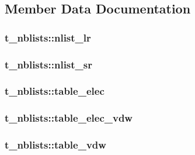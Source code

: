 \subsection{\-Member \-Data \-Documentation}
\hypertarget{structt__nblists_af90bd1d38fe8e0565e12f8f7dff77f98}{
\subsubsection[{nlist\-\_\-lr}]{ {\bf t\-\_\-nblists\-::nlist\-\_\-lr}}}\label{structt__nblists_af90bd1d38fe8e0565e12f8f7dff77f98}
\hypertarget{structt__nblists_af5368c6644825bcac2986ba83eafe92a}{
\subsubsection[{nlist\-\_\-sr}]{ {\bf t\-\_\-nblists\-::nlist\-\_\-sr}}}\label{structt__nblists_af5368c6644825bcac2986ba83eafe92a}
\hypertarget{structt__nblists_ac6a14e47ae176a9b24ae8e5748dc5ba3}{
\subsubsection[{table\-\_\-elec}]{ {\bf t\-\_\-nblists\-::table\-\_\-elec}}}\label{structt__nblists_ac6a14e47ae176a9b24ae8e5748dc5ba3}
\hypertarget{structt__nblists_a00165ffa9a69a6e59449181d2c8e0321}{
\subsubsection[{table\-\_\-elec\-\_\-vdw}]{ {\bf t\-\_\-nblists\-::table\-\_\-elec\-\_\-vdw}}}\label{structt__nblists_a00165ffa9a69a6e59449181d2c8e0321}
\hypertarget{structt__nblists_ab970ecf86ed32212db8e75c945462251}{
\subsubsection[{table\-\_\-vdw}]{ {\bf t\-\_\-nblists\-::table\-\_\-vdw}}}\label{structt__nblists_ab970ecf86ed32212db8e75c945462251}


